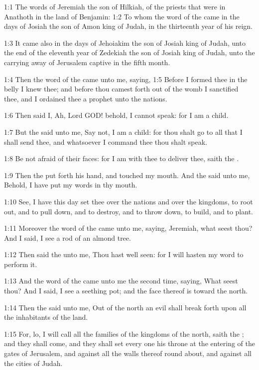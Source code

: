 

1:1 The words of Jeremiah the son of Hilkiah, of the priests that were in Anathoth in the land of Benjamin: 1:2 To whom the word of the \LORD came in the days of Josiah the son of Amon king of Judah, in the thirteenth year of his reign.

1:3 It came also in the days of Jehoiakim the son of Josiah king of Judah, unto the end of the eleventh year of Zedekiah the son of Josiah king of Judah, unto the carrying away of Jerusalem captive in the fifth month.

1:4 Then the word of the \LORD came unto me, saying, 1:5 Before I formed thee in the belly I knew thee; and before thou camest forth out of the womb I sanctified thee, and I ordained thee a prophet unto the nations.

1:6 Then said I, Ah, Lord GOD! behold, I cannot speak: for I am a child.

1:7 But the \LORD said unto me, Say not, I am a child: for thou shalt go to all that I shall send thee, and whatsoever I command thee thou shalt speak.

1:8 Be not afraid of their faces: for I am with thee to deliver thee, saith the \LORD.

1:9 Then the \LORD put forth his hand, and touched my mouth. And the \LORD said unto me, Behold, I have put my words in thy mouth.

1:10 See, I have this day set thee over the nations and over the kingdoms, to root out, and to pull down, and to destroy, and to throw down, to build, and to plant.

1:11 Moreover the word of the \LORD came unto me, saying, Jeremiah, what seest thou? And I said, I see a rod of an almond tree.

1:12 Then said the \LORD unto me, Thou hast well seen: for I will hasten my word to perform it.

1:13 And the word of the \LORD came unto me the second time, saying, What seest thou? And I said, I see a seething pot; and the face thereof is toward the north.

1:14 Then the \LORD said unto me, Out of the north an evil shall break forth upon all the inhabitants of the land.

1:15 For, lo, I will call all the families of the kingdoms of the north, saith the \LORD; and they shall come, and they shall set every one his throne at the entering of the gates of Jerusalem, and against all the walls thereof round about, and against all the cities of Judah.

